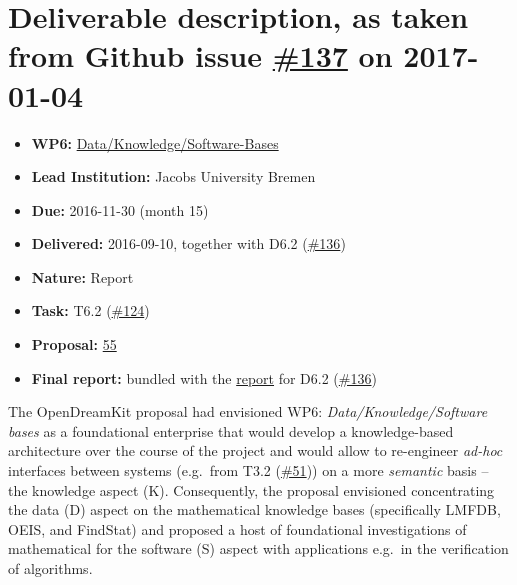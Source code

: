 \section*{\texorpdfstring{Deliverable description, as taken from Github
issue
\href{https://github.com/OpenDreamKit/OpenDreamKit/issues/137}{\#137} on
2017-01-04}{Deliverable description, as taken from Github issue \#137 on 2017-01-04}}\label{deliverable-description-as-taken-from-github-issue-137-on-2017-01-04}

\begin{itemize}
\tightlist
\item
  \textbf{WP6:}
  \href{https://github.com/OpenDreamKit/OpenDreamKit/tree/master/WP6}{Data/Knowledge/Software-Bases}
\item
  \textbf{Lead Institution:} Jacobs University Bremen
\item
  \textbf{Due:} 2016-11-30 (month 15)
\item
  \textbf{Delivered:} 2016-09-10, together with D6.2
  (\href{https://github.com/OpenDreamKit/OpenDreamKit/issues/136}{\#136})
\item
  \textbf{Nature:} Report
\item
  \textbf{Task:} T6.2
  (\href{https://github.com/OpenDreamKit/OpenDreamKit/issues/124}{\#124})
\item
  \textbf{Proposal:}
  \href{https://github.com/OpenDreamKit/OpenDreamKit/raw/master/Proposal/proposal-www.pdf}{55}
\item
  \textbf{Final report:} bundled with the
  \href{https://github.com/OpenDreamKit/OpenDreamKit/raw/master/WP6/D6.2/report-final.pdf}{report}
  for D6.2
  (\href{https://github.com/OpenDreamKit/OpenDreamKit/issues/136}{\#136})
\end{itemize}

The OpenDreamKit proposal had envisioned WP6:
\emph{Data/Knowledge/Software bases} as a foundational enterprise that
would develop a knowledge-based architecture over the course of the
project and would allow to re-engineer \emph{ad-hoc} interfaces between
systems (e.g.~from T3.2
(\href{https://github.com/OpenDreamKit/OpenDreamKit/issues/51}{\#51}))
on a more \emph{semantic} basis -- the knowledge aspect (K).
Consequently, the proposal envisioned concentrating the data (D) aspect
on the mathematical knowledge bases (specifically LMFDB, OEIS, and
FindStat) and proposed a host of foundational investigations of
mathematical for the software (S) aspect with applications e.g.~in the
verification of algorithms.

